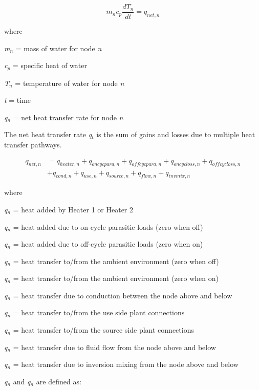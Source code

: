 \begin{equation}
{m_n}{c_p}\frac{{d{T_n}}}{{dt}} = {q_{net,n}}
\end{equation}

where

\emph{m\(_{n}\)} = mass of water for node \emph{n}

\emph{c\(_{p}\)} = specific heat of water

\emph{T\(_{n}\)} = temperature of water for node \emph{n}

\emph{t} = time

\emph{q\(_{n}\)} = net heat transfer rate for node \emph{n}

The net heat transfer rate \emph{q\(_{t}\)} is the sum of gains and losses due to multiple heat transfer pathways.

\begin{equation}
  \begin{array}{ll}
    q_{net,n} &= q_{heater,n} + q_{oncycpara,n} + q_{offcycpara,n} + q_{oncycloss,n} + q_{offcycloss,n} \\ 
              &+ q_{cond,n} + q_{use,n} + q_{source,n} + q_{flow,n} + q_{invmix,n}
  \end{array}
\end{equation}

where

\emph{q\(_{n}\)} = heat added by Heater 1 or Heater 2

\emph{q\(_{n}\)} = heat added due to on-cycle parasitic loads (zero when off)

\emph{q\(_{n}\)} = heat added due to off-cycle parasitic loads (zero when on)

\emph{q\(_{n}\)} = heat transfer to/from the ambient environment (zero when off)

\emph{q\(_{n}\)} = heat transfer to/from the ambient environment (zero when on)

\emph{q\(_{n}\)} = heat transfer due to conduction between the node above and below

\emph{q\(_{n}\)} = heat transfer to/from the use side plant connections

\emph{q\(_{n}\)} = heat transfer to/from the source side plant connections

\emph{q\(_{n}\)} = heat transfer due to fluid flow from the node above and below

\emph{q\(_{n}\)} = heat transfer due to inversion mixing from the node above and below

\emph{q\(_{n}\)} and \emph{q\(_{n}\)} are defined as:

